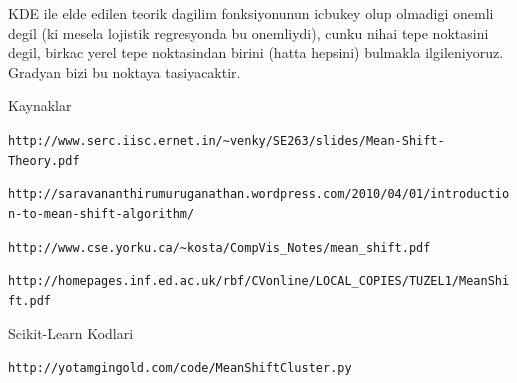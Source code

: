 \documentclass[12pt,fleqn]{article}\usepackage{../common}
\begin{document}
KDE ile elde edilen teorik dagilim fonksiyonunun icbukey olup olmadigi
onemli degil (ki mesela lojistik regresyonda bu onemliydi), cunku
nihai tepe noktasini degil, birkac yerel tepe noktasindan birini
(hatta hepsini) bulmakla ilgileniyoruz. Gradyan bizi bu noktaya
tasiyacaktir.

Kaynaklar

\verb!http://www.serc.iisc.ernet.in/~venky/SE263/slides/Mean-Shift-Theory.pdf!

\verb!http://saravananthirumuruganathan.wordpress.com/2010/04/01/introduction-to-mean-shift-algorithm/!

\verb!http://www.cse.yorku.ca/~kosta/CompVis_Notes/mean_shift.pdf!

\verb!http://homepages.inf.ed.ac.uk/rbf/CVonline/LOCAL_COPIES/TUZEL1/MeanShift.pdf!

Scikit-Learn Kodlari

\verb!http://yotamgingold.com/code/MeanShiftCluster.py!
\end{document}
